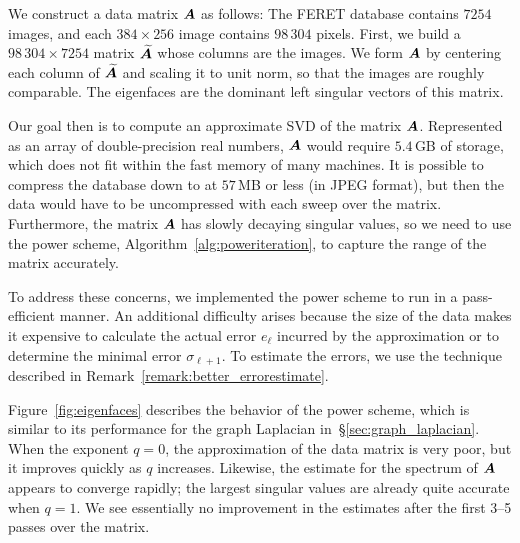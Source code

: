 \documentclass[final]{siamltex}
\newcommand{\pgnotate}[1]{{\color{blue}[#1]}}
\begin{document}
We construct a data matrix $\bm{A}$ as follows:
The FERET database contains $7254$ images, and each
$384 \times 256$ image contains $98\,304$ pixels.  First,
we build a $98\,304 \times 7254$ matrix
$\widetilde{\bm{A}}$ whose columns are the images.
We form $\bm{A}$ by centering each column of $\widetilde{\bm{A}}$
and scaling it to unit norm, so that the images are
roughly comparable.  The eigenfaces are the dominant
left singular vectors of this matrix.

Our goal then is to compute an approximate SVD of the matrix $\bm{A}$.
%
Represented as an array of double-precision real numbers, $\bm{A}$
would require $5.4$\,GB of storage, which does not fit within the fast
memory of many machines. It is possible to compress the database
down to at $57$\,MB or less (in JPEG format), but then the data would
have to be uncompressed with each sweep over the matrix.
%
%
Furthermore, the matrix $\bm{A}$ has slowly
decaying singular values, so we need to use
the power scheme, Algorithm~\ref{alg:poweriteration},
to capture the range of the matrix accurately.

To address these concerns, we implemented the
power scheme to run in a pass-efficient manner.
An additional difficulty arises because the size of the data
makes it expensive to calculate the
actual error $e_{\ell}$ incurred by the approximation
or to determine the minimal error $\sigma_{\ell+1}$.
To estimate the errors, we use the technique described
in Remark~\ref{remark:better_errorestimate}.

Figure~\ref{fig:eigenfaces} describes the behavior
of the power scheme, which is similar to its
performance for the graph Laplacian in~\S\ref{sec:graph_laplacian}.
When the exponent $q = 0$, the approximation of
the data matrix is very poor, but it improves quickly
as $q$ increases.  Likewise, the estimate for the
spectrum of $\bm{A}$ appears to converge
rapidly; the largest singular values are
already quite accurate when $q = 1$.
We see essentially no improvement in the estimates
after the first 3--5 passes over the matrix.

\end{document}
